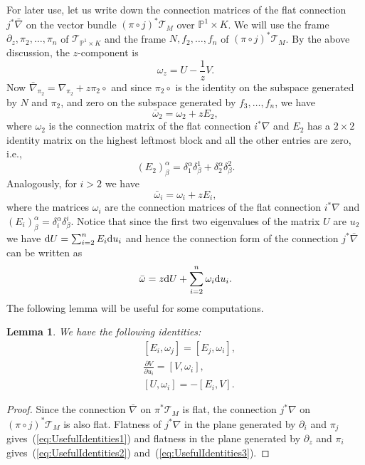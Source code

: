 \documentclass[10pt,a4paper]{amsart}
\numberwithin{equation}{section}
\newtheorem{Lemma}[Theorem]{Lemma}
\begin{document}
 For later use, let us write down the connection matrices of the flat connection $j^{*}\bar{\nabla}$ on the vector bundle $(\pi\circ j)^{*}\mathcal{T}_{M}$ over $\mathbb{P}^{1}\times K$. We will use the frame $\partial_{z},\pi_{2},\dots,\pi_{n}$ of $\mathcal{T}_{\mathbb{P}^{1}\times K}$ and the frame $N,f_{2},\dots,f_{n}$ of $(\pi\circ j)^{*}\mathcal{T}_{M}$. By the above discussion, the $z$-component is
 \begin{equation*}
 \omega_{z}=U-\frac{1}{z}V.
 \end{equation*}
 Now $\bar{\nabla}_{\pi_{2}}=\nabla_{\pi_{2}}+z\pi_{2}\circ$ and since $\pi_{2}\circ$ is the identity on the subspace generated by $N$ and $\pi_{2}$, and zero on the subspace generated by $f_{3},\dots,f_{n}$, we have
 \begin{equation*}
 \bar{\omega}_{2}=\omega_{2}+zE_{2},
 \end{equation*}
 where $\omega_{2}$ is the connection matrix of the flat connection $i^{*}\nabla$ and $E_{2}$ has a $2\times 2$ identity matrix on the highest leftmost block and all the other entries are zero, i.e.,
 \begin{equation*}
 (E_{2})^{\alpha}_{\beta}=\delta^{\alpha}_{1}\delta^{1}_{\beta}+\delta^{\alpha}_{2}\delta^{2}_{\beta}.
 \end{equation*}
 Analogously, for $i>2$ we have
 \begin{equation*}
 \bar{\omega}_{i}=\omega_{i}+zE_{i},
 \end{equation*}
 where the matrices $\omega_{i}$ are the connection matrices of the flat connection $i^{*}\nabla$ and $(E_{i})^{\alpha}_{\beta}=\delta^{\alpha}_{i}\delta^{i}_{\beta}$. Notice that since the first two eigenvalues of the matrix $U$ are $u_{2}$ we have ${\rm d}U=\sum_{i=2}^{n}E_{i}{\rm d}u_{i}$ and hence the connection form of the connection $j^{*}\bar{\nabla}$ can be written as
 \begin{equation}
 \label{eq:ConnectionForm}
 \bar{\omega}=z{\rm d}U+\sum_{i=2}^{n}\omega_{i}{\rm d}u_{i}.
 \end{equation}
 The following lemma will be useful for some computations.
 \begin{Lemma}
 We have the following identities:
 \begin{align}
 & [E_{i},\omega_{j}]=[E_{j},\omega_{i}],\label{eq:UsefulIdentities1} \\
 & \frac{\partial V}{\partial u_{i}}=[V,\omega_{i}], \label{eq:UsefulIdentities2} \\
 & \left[U,\omega_{i}\right]=-[E_{i},V]. \label{eq:UsefulIdentities3}
 \end{align}
 \end{Lemma}
 \begin{proof}
 Since the connection $\bar{\nabla}$ on $\pi^{*}\mathcal{T}_{M}$ is flat, the connection $j^{*}\nabla$ on $(\pi\circ j)^{*}\mathcal{T}_{M}$ is also flat. Flatness of $j^{*}\nabla$ in the plane generated by $\partial_{i}$ and $\pi_{j}$ gives~(\ref{eq:UsefulIdentities1}) and flatness in the plane generated by $\partial_{z}$ and $\pi_{i}$ gives~(\ref{eq:UsefulIdentities2}) and~(\ref{eq:UsefulIdentities3}).
 \end{proof}
\end{document}
